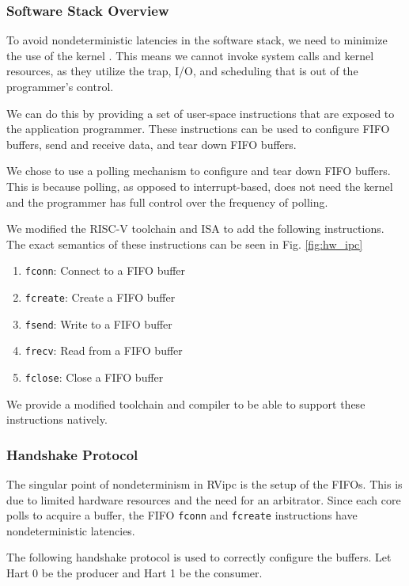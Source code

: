 \subsubsection{Software Stack Overview}
To avoid nondeterministic latencies in the software stack, we need to minimize the use of the kernel \cite{Jia:ATC24:TraplessKprobes}. This means we cannot invoke system calls and kernel resources, as they utilize the trap, I/O, and scheduling that is out of the programmer's control.

We can do this by providing a set of user-space instructions that are exposed to the application programmer. These instructions can be used to configure FIFO buffers, send and receive data, and tear down FIFO buffers. 

We chose to use a polling mechanism to configure and tear down FIFO buffers. This is because polling, as opposed to interrupt-based, does not need the kernel and the programmer has full control over the frequency of polling. 

We modified the RISC-V toolchain and ISA \cite{Waterman:RISC-V:2019} to add the following instructions. The exact semantics of these instructions can be seen in Fig. \ref{fig:hw_ipc}
\begin{enumerate}
  \item \texttt{fconn}: Connect to a FIFO buffer
  \item \texttt{fcreate}: Create a FIFO buffer
  \item \texttt{fsend}: Write to a FIFO buffer
  \item \texttt{frecv}: Read from a FIFO buffer
  \item \texttt{fclose}: Close a FIFO buffer
\end{enumerate}

We provide a modified toolchain and compiler to be able to support these instructions natively.

\subsubsection{Handshake Protocol}
The singular point of nondeterminism in RVipc is the setup of the FIFOs. This is due to limited hardware resources and the need for an arbitrator. Since each core polls to acquire a buffer, the FIFO \texttt{fconn} and \texttt{fcreate} instructions have nondeterministic latencies.

The following handshake protocol is used to correctly configure the buffers. Let Hart 0 be the producer and Hart 1 be the consumer.

